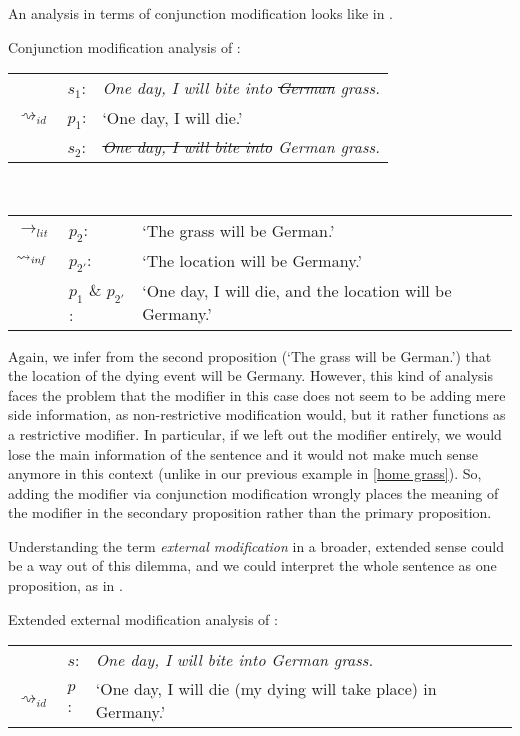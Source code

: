 \documentclass[output=paper]{langsci/langscibook}
\begin{document}
\noindent An analysis in terms of conjunction modification looks like in .

\ea \label{analysis1 German grass} 
Conjunction modification analysis of :\smallskip\\
\begin{tabularx}{\linewidth}[t]{@{}llQ@{}}
 & 	$s_{1}$: & \textit{One day, I will bite into \sout{German} grass.} \\
$\rightsquigarrow_{id}$ &	$p_{1}$: & `One day, I will die.' \medskip\\
& 	$s_{2}$: & \textit{\sout{One day, I will bite into} German grass.} \\
\end{tabularx}\\\begin{tabularx}{\linewidth}[t]{@{}llQ@{}}
$\rightarrow_{lit}$	&	$p_{2}$: & `The grass will be German.' \\
$\rightsquigarrow_{\text{\itshape inf}}$	&	$p_{2'}$: & `The location will be Germany.' \medskip\\
&	$p_{1}$ \& $p_{2'}$: & `One day, I will die, and the location will be Germany.' 
\end{tabularx}
\z

\noindent Again, we infer from the second proposition (`The grass will be German.') that the location of the dying event will be Germany. However, this kind of analysis faces the problem that the modifier in this case does not seem to be adding mere side information, as non-restrictive modification would, but it rather functions as a restrictive modifier. In particular, if we left out the modifier entirely, we would lose the main information of the sentence and it would not make much sense anymore in this context (unlike in our previous example in \ref{home grass}). So, adding the modifier via conjunction modification wrongly places the meaning of the modifier in the secondary proposition rather than the primary proposition. 

Understanding the term \textit{external modification} in a broader, extended sense could be a way out of this dilemma, and we could interpret the whole sentence as one proposition, as in .

\ea \label{analysis2 German grass} 
Extended external modification analysis of :\smallskip\\
\begin{tabularx}{\linewidth}[t]{@{}llQ@{}}
& 	$s$: & \textit{One day, I will bite into German grass.} \\
$\rightsquigarrow_{id%
}$ &	$p$: & `One day, I will die (my dying will take place) in Germany.' \\
\end{tabularx}
\z
\end{document}
